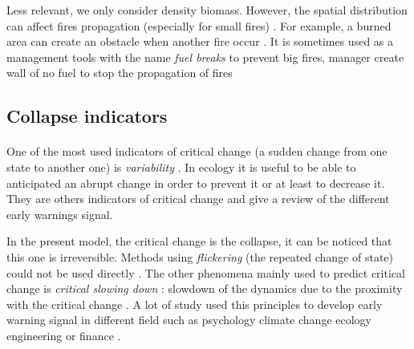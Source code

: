 \documentclass{article}
\begin{document}
Less relevant, we only consider density biomass. However, the spatial distribution can affect fires propagation (especially for small fires) \citep{beaty_spatial_2002}. For example, a burned area can create an obstacle when another fire occur \citep{bergeron_natural_2002, ager_modeling_2007}. It is sometimes used as a management tools with the name \textit{fuel breaks} to prevent big fires, manager create wall of no fuel to stop the propagation of fires \citep{syphard_comparing_2011, agee_use_2000}




\subsection{Collapse indicators}

\paragraph{}
One of the most used indicators of critical change (a sudden change from one state to another one) is \textit{variability} \citep{brock_variance_2006, carpenter2006rising, scheffer2015generic, dakos_robustness_2012, biggs_turning_2009}. In ecology it is useful to be able to anticipated an abrupt change in order to prevent it or at least to decrease it. They are others indicators of critical change \cite{scheffer_generic_2015} and \cite{dakos_methods_2012} give a review of the different early warnings signal. 

In the present model, the critical change is the collapse, it can be noticed that this one is irreversible. Methods using \textit{flickering} (the repeated change of state) could not be used directly \citep{carr_modeling_2012, wang_flickering_2012, dakos_flickering_2013}. The other phenomena mainly used to predict critical change is \textit{critical slowing down} : slowdown of the dynamics due to the proximity with the critical change \citep{dakos_critical_2014, dakos_slowing_nodate, scheffer_anticipating_2012}. A lot of study used this principles to develop early warning signal in different field such as psychology \citep{van_de_leemput_critical_2014} climate change \citep{lenton_early_2012} ecology \citep{chisholm_critical_2009, gandhi_critical_1998} engineering \citep{ren_early_2015} or finance \citep{diks_critical_2018}.
\end{document}
